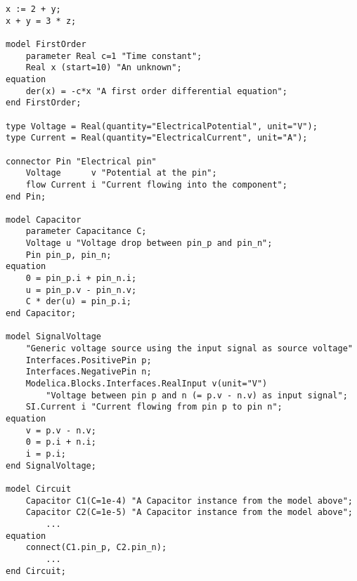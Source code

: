 \begin{verbatim}
x := 2 + y;
x + y = 3 * z;

model FirstOrder
    parameter Real c=1 "Time constant";
    Real x (start=10) "An unknown";
equation
    der(x) = -c*x "A first order differential equation";
end FirstOrder;

type Voltage = Real(quantity="ElectricalPotential", unit="V");
type Current = Real(quantity="ElectricalCurrent", unit="A");

connector Pin "Electrical pin"
    Voltage      v "Potential at the pin";
    flow Current i "Current flowing into the component";
end Pin;

model Capacitor
    parameter Capacitance C;
    Voltage u "Voltage drop between pin_p and pin_n";
    Pin pin_p, pin_n;
equation
    0 = pin_p.i + pin_n.i;
    u = pin_p.v - pin_n.v;
    C * der(u) = pin_p.i;
end Capacitor;

model SignalVoltage
    "Generic voltage source using the input signal as source voltage"
    Interfaces.PositivePin p;
    Interfaces.NegativePin n;
    Modelica.Blocks.Interfaces.RealInput v(unit="V")
        "Voltage between pin p and n (= p.v - n.v) as input signal";
    SI.Current i "Current flowing from pin p to pin n";
equation
    v = p.v - n.v;
    0 = p.i + n.i;
    i = p.i;
end SignalVoltage;

model Circuit
    Capacitor C1(C=1e-4) "A Capacitor instance from the model above";
    Capacitor C2(C=1e-5) "A Capacitor instance from the model above";
        ...
equation
    connect(C1.pin_p, C2.pin_n);
        ...
end Circuit;
\end{verbatim}



